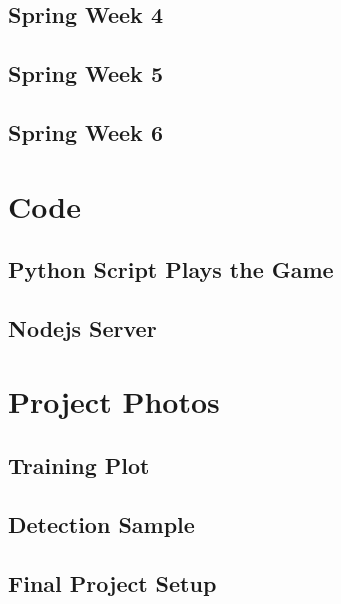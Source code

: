 \documentclass[onecolumn, draftclsnofoot,10pt, compsoc]{IEEEtran}
\begin{document}
\subsection{Spring Week 4}

\subsection{Spring Week 5}

\subsection{Spring Week 6}

\section{Code}
\subsection{Python Script Plays the Game}
\subsection{Nodejs Server}
\section{Project Photos}
\subsection{Training Plot}
\subsection{Detection Sample}
\subsection{Final Project Setup}
\end{document}
